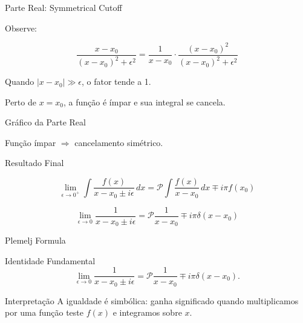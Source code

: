 \documentclass[aspectratio=169]{beamer}
\begin{document}
\begin{frame}{Parte Real: Symmetrical Cutoff}

Observe:

\[
\frac{x-x_0}{(x-x_0)^2+\epsilon^2}
=
\frac{1}{x-x_0}
\cdot
\frac{(x-x_0)^2}{(x-x_0)^2+\epsilon^2}
\]

{\color{mypurple}
Quando $|x-x_0|\gg \epsilon$, o fator tende a 1.
}

\vspace{0.3cm}

{\color{mypurple}
Perto de $x=x_0$, a função é ímpar e sua integral se cancela.
}

\end{frame}

\begin{frame}{Gráfico da Parte Real}

\begin{center}
\end{center}

Função ímpar $\Rightarrow$ cancelamento simétrico.

\end{frame}

\begin{frame}{Resultado Final}

\[
\lim_{\epsilon\to 0^+}
\int
\frac{f(x)}{x-x_0 \pm i\epsilon}\,dx
=
\mathcal{P}
\int
\frac{f(x)}{x-x_0}\,dx
\mp i\pi f(x_0)
\]

\begin{tcolorbox}[colback=blue!5,colframe=myblue]
\[
\lim_{\epsilon\to 0}
\frac{1}{x-x_0 \pm i\epsilon}
=
\mathcal{P}\frac{1}{x-x_0}
\mp i\pi\delta(x-x_0)
\tag{1.105}
\]
\end{tcolorbox}

\end{frame}




\begin{frame}{Plemelj Formula}

\begin{block}{Identidade Fundamental}
\begin{equation}
\lim_{\epsilon\to 0}
\frac{1}{x-x_0 \pm i\epsilon}
=
\mathcal{P}\frac{1}{x-x_0}
\mp i\pi \delta(x-x_0).
\tag{1.105}
\end{equation}
\end{block}

\begin{block}{Interpretação}
A igualdade é simbólica: ganha significado quando multiplicamos
por uma função teste $f(x)$ e integramos sobre $x$.
\end{block}

\end{frame}
\end{document}
